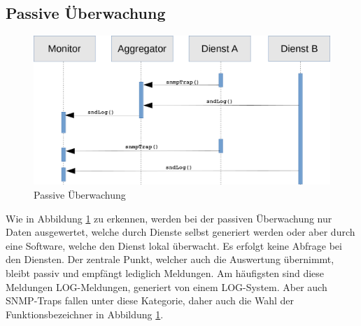 \subsection{Passive Überwachung}
\begin{figure}[htbp]
    \caption{Passive Überwachung}
    \label{passiv}\vspace{0.2cm}
    \centering
    \includegraphics[scale=0.36]{img/sequence_uml_passive_trans}

\end{figure}

Wie in Abbildung \ref{passiv} zu erkennen, werden bei der passiven Überwachung nur Daten
ausgewertet, welche durch Dienste selbst generiert werden oder aber durch eine Software, 
welche den Dienst lokal überwacht. Es erfolgt keine Abfrage bei den Diensten. Der 
zentrale Punkt, welcher auch die Auswertung übernimmt, bleibt passiv und empfängt 
lediglich Meldungen. Am häufigsten sind diese Meldungen LOG-Meldungen, generiert von 
einem LOG-System. Aber auch SNMP-Traps fallen unter diese Kategorie, daher auch die Wahl 
der Funktionsbezeichner in Abbildung \ref{passiv}.